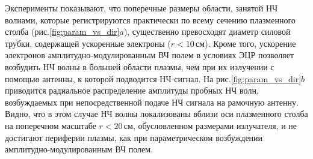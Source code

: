 \documentclass[autoref,10pt]{disser}
\begin{document}
Эксперименты показывают, что поперечные размеры области, занятой НЧ волнами, которые регистрируются практически по всему сечению плазменного столба (\mbox{рис.\ref{fig:param_vs_dir}$a$}), существенно превосходят диаметр силовой трубки, содержащей ускоренные электроны ($r < 10$\,см). Кроме того, ускорение электронов амплитудно-мо\-ду\-ли\-ро\-ван\-ным ВЧ полем в условиях ЭЦР позволяет возбудить НЧ волны в большей области плазмы, чем при их излучении с помощью антенны, к которой подводится НЧ сигнал. На \mbox{рис.\ref{fig:param_vs_dir}$b$} приводится радиальное распределение амплитуды пробных НЧ волн, возбуждаемых при непосредственной подаче НЧ сигнала на рамочную антенну. Видно, что в этом случае НЧ волны локализованы вблизи оси плазменного столба на поперечном масштабе $r < 20$\,см, обусловленном размерами излучателя, и не достигают периферии плазмы, как при параметрическом возбуждении амплитудно-модулированным ВЧ полем.   
\end{document}
